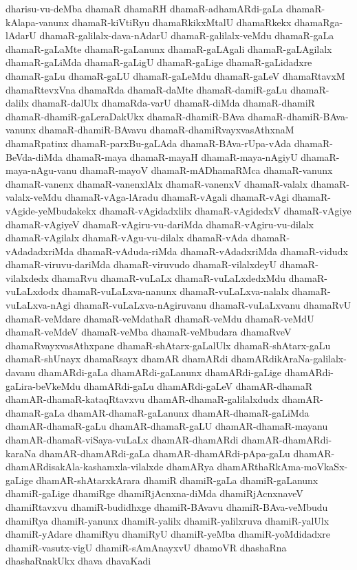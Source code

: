 {dharisu-vu-deMba
dhamaR
dhamaRH
dhamaR-adhamARdi-gaLa
dhamaR-kAlapa-vanunx
dhamaR-kiVtiRyu
dhamaRkikxMtalU
dhamaRkekx
dhamaRga-lAdarU
dhamaR-galilalx-dava-nAdarU
dhamaR-galilalx-veMdu
dhamaR-gaLa
dhamaR-gaLaMte
dhamaR-gaLanunx
dhamaR-gaLAgali
dhamaR-gaLAgilalx
dhamaR-gaLiMda
dhamaR-gaLigU
dhamaR-gaLige
dhamaR-gaLidadxre
dhamaR-gaLu
dhamaR-gaLU
dhamaR-gaLeMdu
dhamaR-gaLeV
dhamaRtavxM
dhamaRtevxVna
dhamaRda
dhamaR-daMte
dhamaR-damiR-gaLu
dhamaR-dalilx
dhamaR-dalUlx
dhamaRda-varU
dhamaR-diMda
dhamaR-dhamiR
dhamaR-dhamiR-gaLeraDakUkx
dhamaR-dhamiR-BAva
dhamaR-dhamiR-BAva-vanunx
dhamaR-dhamiR-BAvavu
dhamaR-dhamiRvayxvasAthxnaM
dhamaRpatinx
dhamaR-parxBu-gaLAda
dhamaR-BAva-rUpa-vAda
dhamaR-BeVda-diMda
dhamaR-maya
dhamaR-mayaH
dhamaR-maya-nAgiyU
dhamaR-maya-nAgu-vanu
dhamaR-mayoV
dhamaR-mADhamaRMca
dhamaR-vanunx
dhamaR-vanenx
dhamaR-vanenxlAlx
dhamaR-vanenxV
dhamaR-valalx
dhamaR-valalx-veMdu
dhamaR-vAga-lAradu
dhamaR-vAgali
dhamaR-vAgi
dhamaR-vAgide-yeMbudakekx
dhamaR-vAgidadxlilx
dhamaR-vAgidedxV
dhamaR-vAgiye
dhamaR-vAgiyeV
dhamaR-vAgiru-vu-dariMda
dhamaR-vAgiru-vu-dilalx
dhamaR-vAgilalx
dhamaR-vAgu-vu-dilalx
dhamaR-vAda
dhamaR-vAdadadxriMda
dhamaR-vAduda-riMda
dhamaR-vAdadxriMda
dhamaR-vidudx
dhamaR-viruvu-dariMda
dhamaR-viruvudo
dhamaR-vilalxdeyU
dhamaR-vilalxdedx
dhamaRvu
dhamaR-vuLaLx
dhamaR-vuLaLxdedxMdu
dhamaR-vuLaLxdodx
dhamaR-vuLaLxva-nanunx
dhamaR-vuLaLxva-nalalx
dhamaR-vuLaLxva-nAgi
dhamaR-vuLaLxva-nAgiruvanu
dhamaR-vuLaLxvanu
dhamaRvU
dhamaR-veMdare
dhamaR-veMdathaR
dhamaR-veMdu
dhamaR-veMdU
dhamaR-veMdeV
dhamaR-veMba
dhamaR-veMbudara
dhamaRveV
dhamaRvayxvasAthxpane
dhamaR-shAtarx-gaLalUlx
dhamaR-shAtarx-gaLu
dhamaR-shUnayx
dhamaRsayx
dhamAR
dhamARdi
dhamARdikAraNa-galilalx-davanu
dhamARdi-gaLa
dhamARdi-gaLanunx
dhamARdi-gaLige
dhamARdi-gaLira-beVkeMdu
dhamARdi-gaLu
dhamARdi-gaLeV
dhamAR-dhamaR
dhamAR-dhamaR-kataqRtavxvu
dhamAR-dhamaR-galilalxdudx
dhamAR-dhamaR-gaLa
dhamAR-dhamaR-gaLanunx
dhamAR-dhamaR-gaLiMda
dhamAR-dhamaR-gaLu
dhamAR-dhamaR-gaLU
dhamAR-dhamaR-mayanu
dhamAR-dhamaR-viSaya-vuLaLx
dhamAR-dhamARdi
dhamAR-dhamARdi-karaNa
dhamAR-dhamARdi-gaLa
dhamAR-dhamARdi-pApa-gaLu
dhamAR-dhamARdisakAla-kashamxla-vilalxde
dhamARya
dhamARthaRkAma-moVkaSx-gaLige
dhamAR-shAtarxkArara
dhamiR
dhamiR-gaLa
dhamiR-gaLanunx
dhamiR-gaLige
dhamiRge
dhamiRjAcnxna-diMda
dhamiRjAcnxnaveV
dhamiRtavxvu
dhamiR-budidhxge
dhamiR-BAvavu
dhamiR-BAva-veMbudu
dhamiRya
dhamiR-yanunx
dhamiR-yalilx
dhamiR-yalilxruva
dhamiR-yalUlx
dhamiR-yAdare
dhamiRyu
dhamiRyU
dhamiR-yeMba
dhamiR-yoMdidadxre
dhamiR-vasutx-vigU
dhamiR-sAmAnayxvU
dhamoVR
dhashaRna
dhashaRnakUkx
dhava
dhavaKadi
}
